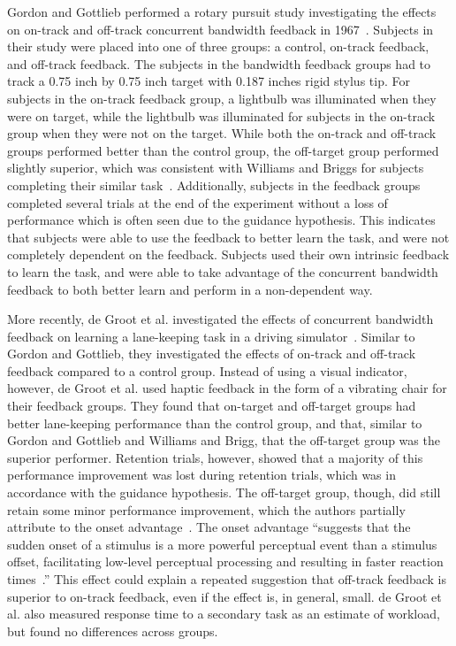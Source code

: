 \documentclass[float=false, crop=false]{standalone}
\begin{document}
Gordon and Gottlieb performed a rotary pursuit study investigating the effects on on-track and off-track concurrent bandwidth feedback in 1967~\cite{Gordon1967}.
Subjects in their study were placed into one of three groups: a control, on-track feedback, and off-track feedback.
The subjects in the bandwidth feedback groups had to track a 0.75 inch by 0.75 inch target with 0.187 inches rigid stylus tip.
For subjects in the on-track feedback group, a lightbulb was illuminated when they were on target, while the lightbulb was illuminated for subjects in the on-track group when they were not on the target.
While both the on-track and off-track groups performed better than the control group, the off-target group performed slightly superior, which was consistent with Williams and Briggs for subjects completing their similar task~\cite{williams1962target}.
Additionally, subjects in the feedback groups completed several trials at the end of the experiment without a loss of performance which is often seen due to the guidance hypothesis.
This indicates that subjects were able to use the feedback to better learn the task, and were not completely dependent on the feedback.
Subjects used their own intrinsic feedback to learn the task, and were able to take advantage of the concurrent bandwidth feedback to both better learn and perform in a non-dependent way.

More recently, de Groot et al. investigated the effects of concurrent bandwidth feedback on learning a lane-keeping task in a driving simulator~\cite{DeGroot2011}.
Similar to Gordon and Gottlieb, they investigated the effects of on-track and off-track feedback compared to a control group.
Instead of using a visual indicator, however, de Groot et al. used haptic feedback in the form of a vibrating chair for their feedback groups.
They found that on-target and off-target groups had better lane-keeping performance than the control group, and that, similar to Gordon and Gottlieb and Williams and Brigg, that the off-target group was the superior performer.
Retention trials, however, showed that a majority of this performance improvement was lost during retention trials, which was in accordance with the guidance hypothesis.
The off-target group, though, did still retain some minor performance improvement, which the authors partially attribute to the onset advantage~\cite{fischer2008differential}.
The onset advantage ``suggests that the sudden onset of a stimulus is a
more powerful perceptual event than a stimulus offset, facilitating low-level perceptual processing and resulting in faster reaction times~\cite{DeGroot2011}.''
This effect could explain a repeated suggestion that off-track feedback is superior to on-track feedback, even if the effect is, in general, small.
de Groot et al. also measured response time to a secondary task as an estimate of workload, but found no differences across groups.
\end{document}
